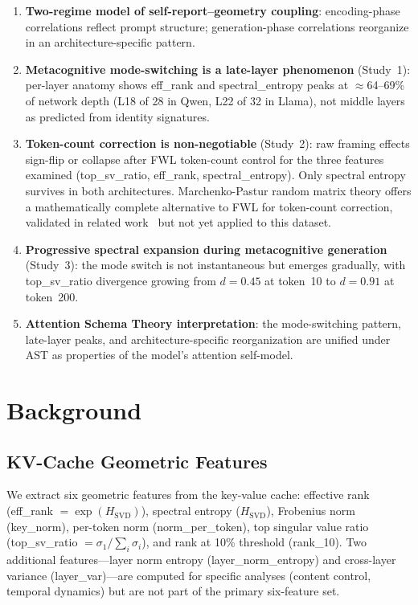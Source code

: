 \documentclass[11pt,a4paper]{article}
\begin{document}
\begin{enumerate}
    \item \textbf{Two-regime model of self-report--geometry coupling}: encoding-phase correlations reflect prompt structure; generation-phase correlations reorganize in an architecture-specific pattern.

    \item \textbf{Metacognitive mode-switching is a late-layer phenomenon} (Study~1): per-layer anatomy shows eff\_rank and spectral\_entropy peaks at $\approx$64--69\% of network depth (L18 of 28 in Qwen, L22 of 32 in Llama), not middle layers as predicted from identity signatures.

    \item \textbf{Token-count correction is non-negotiable} (Study~2): raw framing effects sign-flip or collapse after FWL token-count control for the three features examined (top\_sv\_ratio, eff\_rank, spectral\_entropy). Only spectral entropy survives in both architectures. Marchenko-Pastur random matrix theory offers a mathematically complete alternative to FWL for token-count correction, validated in related work~\citep{lyra2026oracle} but not yet applied to this dataset.

    \item \textbf{Progressive spectral expansion during metacognitive generation} (Study~3): the mode switch is not instantaneous but emerges gradually, with top\_sv\_ratio divergence growing from $d = 0.45$ at token~10 to $d = 0.91$ at token~200.

    \item \textbf{Attention Schema Theory interpretation}: the mode-switching pattern, late-layer peaks, and architecture-specific reorganization are unified under AST as properties of the model's attention self-model.
\end{enumerate}

\section{Background}
\label{sec:background}

\subsection{KV-Cache Geometric Features}

We extract six geometric features from the key-value cache: effective rank
(eff\_rank $= \exp(H_{\text{SVD}})$), spectral entropy ($H_{\text{SVD}}$),
Frobenius norm (key\_norm), per-token norm (norm\_per\_token), top singular
value ratio (top\_sv\_ratio $= \sigma_1 / \sum_i \sigma_i$), and rank at
10\% threshold (rank\_10). Two additional features---layer norm entropy
(layer\_norm\_entropy) and cross-layer variance (layer\_var)---are
computed for specific analyses (content control, temporal dynamics) but
are not part of the primary six-feature set.
\end{document}
